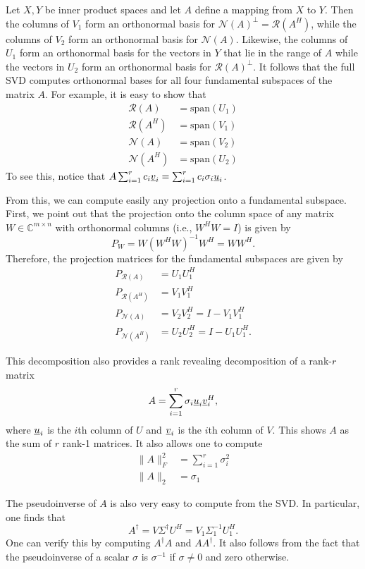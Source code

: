 Let $X,Y$ be inner product spaces and let $A$ define a mapping from $X$ to $Y$.
Then the columns of $V_1$ form an orthonormal basis for $\mathcal N(A)^\bot=\mathcal R(A^H)$, while the columns of $V_2$ form an orthonormal basis for $\mathcal N(A)$.
Likewise, the columns of $U_1$ form an orthonormal basis for the vectors in $Y$ that lie in the range of $A$ while the vectors in $U_2$ form an orthonormal basis for $\mathcal{R}(A)^\bot$.
It follows that the full SVD computes orthonormal bases for all four fundamental subspaces of the matrix $A$.
For example, it is easy to show that
\begin{align*}
\mathcal{R}(A) &= \textrm{span} (U_1) \\
\mathcal{R}(A^H) &= \textrm{span} (V_1) \\
\mathcal{N}(A) &= \textrm{span} (V_2) \\
\mathcal{N}(A^H) &= \textrm{span} (U_2)
\end{align*}
To see this, notice that $A \sum_{i=1}^r c_i \underline{v}_i = \sum_{i=1}^r c_i \sigma_i \underline{u}_i$.

From this, we can compute easily any projection onto a fundamental subspace.
First, we point out that the projection onto the column space of any matrix $W\in \mathbb{C}^{m \times n}$ with orthonormal columns (i.e., $W^H W = I$) is given by
\[ P_W = W (W^H W)^{-1} W^H = W W^H. \]
Therefore, the projection matrices for the fundamental subspaces are given by
\begin{align*}
P_{\mathcal{R}(A)} &= U_1 U_1^H \\
P_{\mathcal{R}(A^H)} &= V_1 V_1^H \\
P_{\mathcal{N}(A)} &= V_2 V_2^H = I - V_1 V_1^H \\
P_{\mathcal{N}(A^H)} &= U_2 U_2^H = I - U_1 U_1^H.
\end{align*}

This decomposition also provides a rank revealing decomposition of a rank-$r$ matrix
\[ A = \sum_{i=1}^r \sigma_i \underline{u}_i \underline{v}_i^H, \]
where $\underline{u}_i$ is the $i$th column of $U$ and $\underline{v}_i$ is the $i$th column of $V$.
This shows $A$ as the sum of $r$ rank-1 matrices.
It also allows one to compute
\begin{align*}
\| A \|_F^2 &= \sum_{i=1}^r \sigma_i^2 \\
\| A \|_2 &= \sigma_1
\end{align*}

The pseudoinverse of $A$ is also very easy to compute from the SVD.
In particular, one finds that
\[ A^\dagger = V \Sigma^\dagger U^H = V_1 \Sigma_1^{-1} U_1^H. \]
One can verify this by computing $A^\dagger A$ and $A A^\dagger$.
It also follows from the fact that the pseudoinverse of a scalar $\sigma$ is $\sigma^{-1}$ if $\sigma \neq 0$ and zero otherwise.


